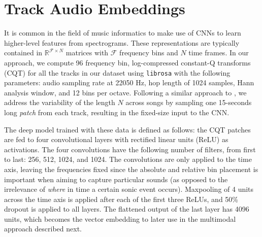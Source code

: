 

\section{Track Audio Embeddings}\label{sec:cold-rec:audio}

It is common in the field of music informatics to make use of CNNs to learn higher-level features from spectrograms.
These representations are typically contained in $\mathbb{R}^{\mathcal{F} \times N}$ matrices with $\mathcal{F}$ frequency bins and $N$ time frames.
In our approach, we compute 96 frequency bin, log-compressed constant-Q transforms (CQT) \citep{Schorkhuber2010} for all the tracks in our dataset using \texttt{librosa} \citep{Mcfee2015} with the following parameters: audio sampling rate at 22050 Hz, hop length of 1024 samples, Hann analysis window, and 12 bins per octave.
Following a similar approach to \cite{Oord2013}, we address the variability of the length $N$ across songs by sampling one 15-seconds long \emph{patch} from each track, resulting in the fixed-size input to the CNN.

The deep model trained with these data is defined as follows: the CQT patches are fed to four convolutional layers with rectified linear units (ReLU) as activations.
The four convolutions have the following number of filters, from first to last: 256, 512, 1024, and 1024.
The convolutions are only applied to the time axis, leaving the frequencies fixed since the absolute and relative bin placement is important when aiming to capture particular sounds (as opposed to the irrelevance of \emph{where} in time a certain sonic event occurs).
Maxpooling of 4 units across the time axis is applied after each of the first three ReLUs, and 50\% dropout is applied to all layers.
The flattened output of the last layer has 4096 units, which becomes the vector embedding to later use in the multimodal approach described next.

